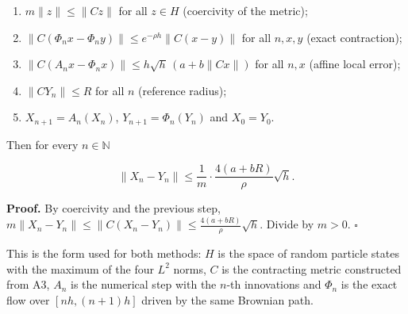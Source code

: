 \documentclass[11pt,a4paper]{report}
\begin{document}
\begin{enumerate}


\item \(m\|z\|\le\|Cz\|\) for all \(z\in H\) (coercivity of the metric);

\item \(\|C(\Phi_nx-\Phi_ny)\|\le e^{-\rho h}\|C(x-y)\|\) for all \(n,x,y\) (exact contraction);

\item \(\|C(A_nx-\Phi_nx)\|\le h\sqrt h\,(a+b\|Cx\|)\) for all \(n,x\) (affine local error);

\item \(\|CY_n\|\le R\) for all \(n\) (reference radius);

\item \(X_{n+1}=A_n(X_n)\), \(Y_{n+1}=\Phi_n(Y_n)\) and \(X_0=Y_0\).

\end{enumerate}



Then for every \(n\in\mathbb N\)


\[\|X_n-Y_n\|\le\frac{1}{m}\cdot\frac{4(a+bR)}{\rho}\sqrt h .\]


\textbf{Proof.} By coercivity and the previous step, \(m\|X_n-Y_n\|\le\|C(X_n-Y_n)\|\le\frac{4(a+bR)}{\rho}\sqrt h\). Divide by \(m>0\). \(\square\)




This is the form used for both methods: \(H\) is the space of random particle states with the maximum of the four \(L^2\) norms, \(C\) is the contracting metric constructed from A3, \(A_n\) is the numerical step with the \(n\)-th innovations and \(\Phi_n\) is the exact flow over \([nh,(n+1)h]\) driven by the same Brownian path.
\end{document}
